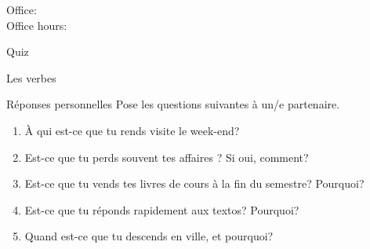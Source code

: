 \documentclass{beamer}
\subtitle[Prépositions et verbes \lexi{-re}]{Les prépositions de lieu et les verbes \lexi{-re}}
\begin{document}
  \begin{frame}
    \titlepage
    \tiny{Office: \\
          Office hours: }
  \end{frame}

  \begin{frame}{}
    \begin{center}
      \Large Quiz
    \end{center}
  \end{frame}

  \begin{frame}{Les verbes }
    \begin{center}
      
    \end{center}
  \end{frame}

  \begin{frame}{Réponses personnelles}
    Pose les questions suivantes à un/e partenaire. \\
    \begin{center}
      \begin{enumerate}
        \item À qui est-ce que tu rends visite le week-end?
        \item Est-ce que tu perds souvent tes affaires ? Si oui, comment?
        \item Est-ce que tu vends tes livres de cours à la fin du semestre? Pourquoi?
        \item Est-ce que tu réponds rapidement aux textos? Pourquoi?
        \item Quand est-ce que tu descends en ville, et pourquoi?
      \end{enumerate}
    \end{center}
  \end{frame}
\end{document}
